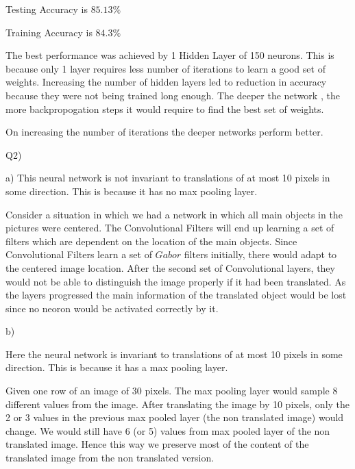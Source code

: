 \documentclass[]{article}
\begin{document}
\bigskip

Testing Accuracy  is $85.13\%$ 

Training Accuracy  is $84.3\%$ 

The best performance was achieved by 1 Hidden Layer of 150 neurons. This is because only 1 layer requires less number of iterations to learn a good set of weights.
Increasing the number of hidden layers led to reduction in accuracy because they were not being trained long enough. The deeper the network , the more backpropogation steps it would require to find the best set of weights.

On increasing the number of iterations the deeper networks perform better.

\bigskip
\bigskip
\bigskip

Q2)

a) This neural network is not  invariant to translations of at most 10 pixels in some direction. This is because it has no max pooling layer.

Consider a situation in which we had a network in which all main objects in the pictures were centered.
The Convolutional Filters will end up learning a set of filters which are dependent on the location of the main objects. Since Convolutional Filters learn a set of $Gabor$ filters initially, there would adapt to the centered image location. After the second set of Convolutional layers, they would not be able to distinguish the image properly if it had been translated.
As the layers progressed the main information of the translated object would be lost since no neoron would be activated correctly by it.


b)

Here the neural network is   invariant to translations of at most 10 pixels in some direction. This is because it has a max pooling layer.

Given one row of an  image  of 30 pixels. The max pooling layer would sample 8 different values from the image. After translating the image by 10 pixels, only the 2 or 3 values in the previous max pooled layer (the non translated image) would change. We would still have 6 (or 5) values from max pooled layer of  the non translated image. Hence this way we preserve most of the content of the translated image from the non translated version.
\end{document}
